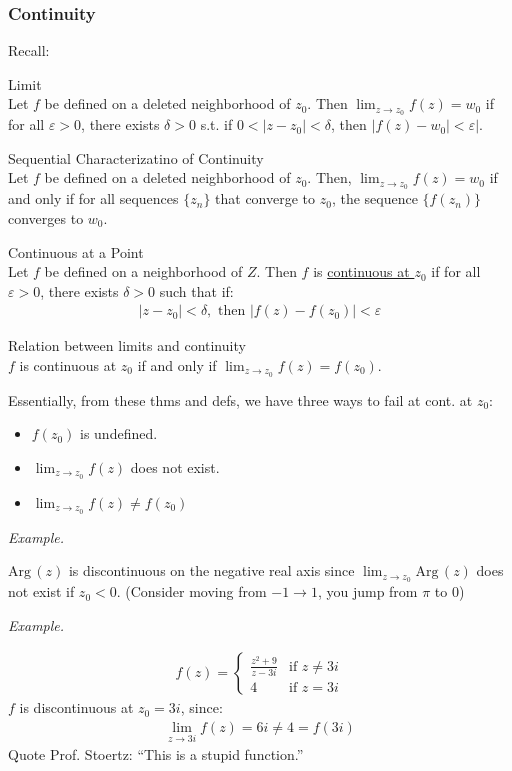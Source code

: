 \documentclass[10pt]{paper}
\newcommand{\gspc}{\vspace{0.13cm}} %
\newcommand{\gline}[0]{\gspc\\} %
\newcommand{\Arg}{\mathrm{Arg}\,}
\newcommand{\ul}[1]{\underline{#1}}
\renewenvironment{example}{
  \begin{tcolorbox}[colback=gray!2, colframe=gray!40!white, coltitle=green!20!black, boxrule=3pt, sharp corners, breakable]
    \textit{Example.}
}{\end{tcolorbox}}
\begin{document}
\subsubsection{Continuity}
Recall:
\begin{theorem}{Limit}{}\gline{}
  Let $f$ be defined on a deleted neighborhood of $z_0$. Then $\lim_{z\to z_0}f(z)=w_0$ if for all $\varepsilon>0$, there exists $\delta> 0$ s.t. if $0<|z-z_0|<\delta$, then $|f(z)-w_0|<\varepsilon|$. 
\end{theorem}
\begin{theorem}{Sequential Characterizatino of Continuity}{}\gline{}
  Let $f$ be defined on a deleted neighborhood of $z_0$. Then, $\lim_{z\to z_0}f(z) = w_0$ if and only if for all sequences $\{z_n\}$ that converge to $z_0$, the sequence $\{f(z_n)\}$ converges to $w_0$. 
\end{theorem}
\begin{definition}{Continuous at a Point}{}\gline{}
  Let $f$ be defined on a neighborhood of $Z$. Then $f$ is \ul{continuous at $z_0$} if for all $\varepsilon> 0$, there exists $\delta > 0$ such that if:
  \begin{align*}
    |z-z_0|<\delta,\text{ then } |f(z)-f(z_0)|<\varepsilon
  \end{align*}
\end{definition}
\begin{theorem}{Relation between limits and continuity}{}\gline{}
  $f$ is continuous at $z_0$ if and only if $\lim_{z\to z_0}f(z) = f(z_0)$.
\end{theorem}
\noindent Essentially, from these thms and defs, we have three ways to fail at cont. at $z_0$:
\begin{itemize}
  \item $f(z_0)$ is undefined.
  \item $\lim_{z\to z_0}f(z)$ does not exist.
  \item $\lim_{z\to z_0}f(z)\ne f(z_0)$
\end{itemize} 
\begin{example}
  $\Arg(z)$ is discontinuous on the negative real axis since $\lim_{z\to z_0}\Arg(z)$ does not exist if $z_0 < 0$. (Consider moving from $-1 \to 1$, you jump from $\pi$ to $0$)
\end{example}
\begin{example}
  \begin{align*}
    f(z)=\begin{cases}
      \frac{z^2+9}{z-3i}&\text{if } z\ne 3i\\
      4&\text{if } z = 3i
    \end{cases}
  \end{align*}
  $f$ is discontinuous at $z_0 = 3i$, since:
  \begin{align*}
    \lim_{z\to 3i}f(z) = 6i \ne 4 = f(3i)
  \end{align*}
  Quote Prof. Stoertz: ``This is a stupid function.''
\end{example}
\end{document}
